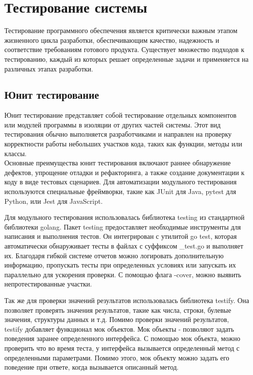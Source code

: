 \section{Тестирование системы}
Тестирование программного обеспечения является критически важным этапом жизненного цикла разработки, 
обеспечивающим качество, надежность и соответствие требованиям готового продукта. Существует множество 
подходов к тестированию, каждый из которых решает определенные задачи и применяется на различных этапах 
разработки.

\subsection{Юнит тестирование}
Юнит тестирование представляет собой тестирование отдельных компонентов или модулей программы в изоляции 
от других частей системы. Этот вид тестирования обычно выполняется разработчиками и направлен на проверку 
корректности работы небольших участков кода, таких как функции, методы или классы.\\
Основные преимущества юнит тестирования включают раннее обнаружение дефектов, упрощение 
отладки и рефакторинга, а также создание документации к коду в виде тестовых сценариев. 
Для автоматизации модульного тестирования используются специальные фреймворки, 
такие как JUnit для Java, pytest для Python, или Jest для JavaScript.

Для модульного тестирования использовалась библиотека testing из стандартной библиотеки golang.
Пакет testing предоставляет необходимые инструменты для написания и выполнения тестов. 
Он интегрирован с утилитой go test, которая автоматически обнаруживает тесты в файлах с суффиксом \_test.go 
и выполняет их. Благодаря гибкой системе отчетов можно логировать дополнительную информацию, пропускать тесты при определенных условиях или запускать их параллельно для ускорения проверки.
С помощью флага -cover, можно выявить непротестированные участки.

Так же для проверки значений результатов использовалась библиотека testify. Она позволяет проверять значения результатов, такие как числа, строки, булевые значения, структуры данных и т.д.
Помимо проверки значений результатов, testify добавляет функционал мок объектов. Мок объекты - позволяют задать
поведения заранее определенного интерфейса. С помощью мок объекта, можно проверить что во время теста, у интерфейса
вызывается определенный метод с определенными параметрами. Помимо этого, мок объекту можно задать его поведение при
ответе, когда вызывается описанный метод.

